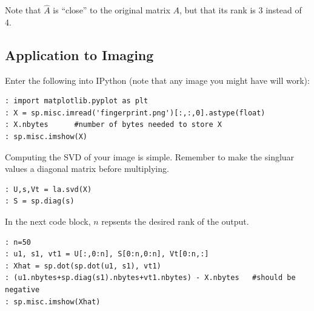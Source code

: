 
Note that $\widehat A$ is ``close'' to the original matrix $A$, but
that its rank is 3 instead of 4.

\subsection*{Application to Imaging}


Enter the following into IPython (note that any image you might have will work):
\begin{lstlisting}
: import matplotlib.pyplot as plt
: X = sp.misc.imread('fingerprint.png')[:,:,0].astype(float)
: X.nbytes      #number of bytes needed to store X
: sp.misc.imshow(X)
\end{lstlisting}
Computing the SVD of your image is simple.  Remember to make the singluar values a diagonal matrix before multiplying.
\begin{lstlisting}
: U,s,Vt = la.svd(X)
: S = sp.diag(s)
\end{lstlisting}
In the next code block, $n$ repsents the desired rank of the output.
\begin{lstlisting}
: n=50
: u1, s1, vt1 = U[:,0:n], S[0:n,0:n], Vt[0:n,:]
: Xhat = sp.dot(sp.dot(u1, s1), vt1)
: (u1.nbytes+sp.diag(s1).nbytes+vt1.nbytes) - X.nbytes   #should be negative
: sp.misc.imshow(Xhat)
\end{lstlisting}

